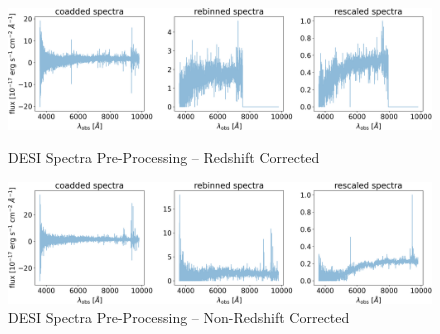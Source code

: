 \begin{frame}
    \begin{figure}[t!]
        \centering
        \includegraphics[width=\textwidth]{figures/preprocess/3600_Zcorrected_spectra.png}
        \caption{DESI Spectra Pre-Processing --  Redshift Corrected}
        \label{fig:spectra_preproc}
        \includegraphics[width=\textwidth]{figures/preprocess/3600_Zrestframe_spectra.png}
        \caption{DESI Spectra Pre-Processing --  Non-Redshift Corrected}
        \label{fig:sepctra_preproc_nored}
    \end{figure} 
\end{frame}

